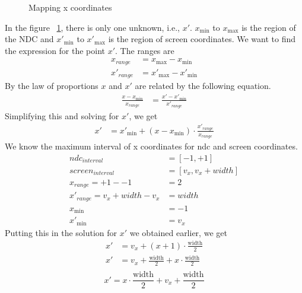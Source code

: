 \begin{figure}[h]
\centering
{}


\centering
{}

\caption{Mapping x coordinates}
\label{fig:viewport-xform-x}
\end{figure}
In the figure ~\ref{fig:viewport-xform-x}, there is only one unknown, i.e., $x'$.
$x_{\min}$ to $x_{\max}$ is the region of the NDC and $x'_{\min}$ to $x'_{\max}$ is the region of screen coordinates. We want to find the expression for the point $x'$. The ranges are
\begin{align*}
x_{range} &= x_{\max} - x_{\min} \\ x'_{range} &= x'_{\max} - x'_{\min} 
\end{align*}
By the law of proportions $x$ and $x'$ are related by the following equation.
\begin{align*}
\frac{x-x_{\min}}{x_{range}} &= \frac{x'-x'_{\min}}{x'_{range}} 
\end{align*}
Simplifying this and solving for $x'$, we get 
\begin{align*}
x' &= x'_{\min} + (x-x_{\min}) \cdot \frac{x'_{range}}{x_{range}}
\end{align*}
We know the maximum interval of x coordinates for ndc and screen coordinates.
\begin{align*}
ndc_{interval} &= [-1,+1] \\
screen_{interval} &= [v_x,v_x+width] \\
x_{range} = +1 - -1 &= 2 \\
x'_{range} = v_x+width - v_x &=  width \\
x_{\min} &= -1 \\
x'_{\min} &= v_x
\end{align*}
Putting this in the solution for $x'$ we obtained earlier, we get
\begin{align*}
x' &= v_x + (x + 1) \cdot \frac{\text{width}}{2} \\
  x' &= v_x + \frac{\text{width}}{2} + x \cdot \frac{\text{width}}{2} \\
\end{align*}
\begin{equation}
    x' = x \cdot \frac{\text{width}}{2} + v_x + \frac{\text{width}}{2} 
\end{equation}

